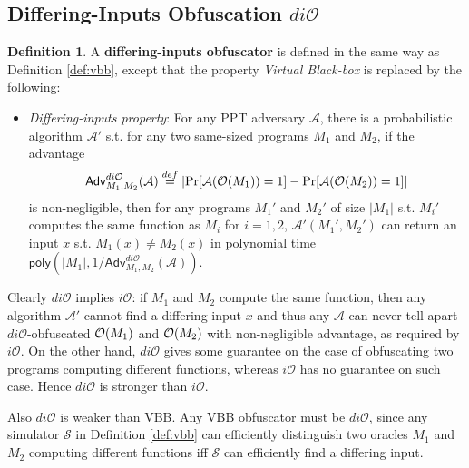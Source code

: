 \documentclass[12pt]{article}
\newcommand{\eqdef}{\stackrel{def}{=}}
\newcommand{\A}{\mathcal{A}}
\newcommand{\Sim}{\mathcal{S}}
\newcommand{\Adv}{\mathsf{Adv}}
\newcommand{\poly}{\mathsf{poly}}
\newcommand{\io}{i\mathcal{O}}
\newcommand{\dio}{di\mathcal{O}}
\theoremstyle{definition}
\newtheorem{definition}[theorem]{Definition}
\begin{document}
\subsection{Differing-Inputs Obfuscation $\dio$}
\begin{definition}
\label{def:dio}
A {\bf differing-inputs obfuscator} is defined in the same way as Definition \ref{def:vbb}, except that the property \emph{Virtual Black-box} is replaced by the following:
\begin{itemize}
\item \emph{Differing-inputs property}: For any PPT adversary $\A$, there is a probabilistic algorithm $\A'$ s.t. for any two same-sized programs $M_1$ and $M_2$, if the advantage
$$\Adv_{M_1,M_2}^{\dio}(\A) \eqdef \left| \Pr[\A(\bigoh(M_1))=1] - \Pr[\A(\bigoh(M_2))=1] \right|$$
is non-negligible, then for any programs $M_1'$ and $M_2'$ of size $|M_1|$ s.t. $M_i'$ computes the same function as $M_i$ for $i=1,2$, $\A'(M_1',M_2')$ can return an input $x$ s.t. $M_1(x) \not= M_2(x)$ in polynomial time $\poly(|M_1|, 1/\Adv_{M_1,M_2}^{\dio}(\A))$.
\end{itemize}
\end{definition}

Clearly $\dio$ implies $\io$: if $M_1$ and $M_2$ compute the same function, then any algorithm $\A'$ cannot find a differing input $x$ and thus any $\A$ can never tell apart $\dio$-obfuscated $\mathcal{O}(M_1)$ and $\mathcal{O}(M_2)$ with non-negligible advantage, as required by $\io$.
On the other hand, $\dio$ gives some guarantee on the case of obfuscating two programs computing different functions, whereas $\io$ has no guarantee on such case. Hence $\dio$ is stronger than $\io$.

Also $\dio$ is weaker than VBB. Any VBB obfuscator must be $\dio$, since any simulator $\Sim$ in Definition \ref{def:vbb} can efficiently distinguish two oracles $M_1$ and $M_2$ computing different functions iff $\Sim$ can efficiently find a differing input.
\end{document}
